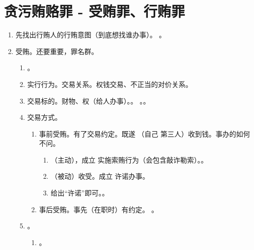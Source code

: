 \section{贪污贿赂罪 - 受贿罪、行贿罪}
\begin{enumerate}
  \item 先找出行贿人的行贿意图（到底想找谁办事）。
        。
  \item 受贿。还要重要，罪名群。
        \begin{enumerate}
          \item {}。
          \item 实行行为。交易关系。权钱交易、不正当的对价关系。
          \item 交易标的。财物、权（给人办事）。。
                。。
          \item 交易方式。
                \begin{enumerate}
                  \item 事前受贿。有了交易约定。既遂 \yjt（自己 \hz 第三人）收到钱。事办的如何不问。
                        \begin{enumerate}
                          \item （主动），成立 \yjt 实施索贿行为（会包含敲诈勒索）。。
                          \item （被动）收受。成立 \yjt 许诺办事。
                          \item 给出“许诺”即可。。
                        \end{enumerate}
                  \item 事后受贿。事先（在职时）有约定。
                        。
                \end{enumerate}
          \item {}。
                \begin{enumerate}
                  \item {}。

\end{enumerate}
\end{enumerate}
\end{enumerate}
